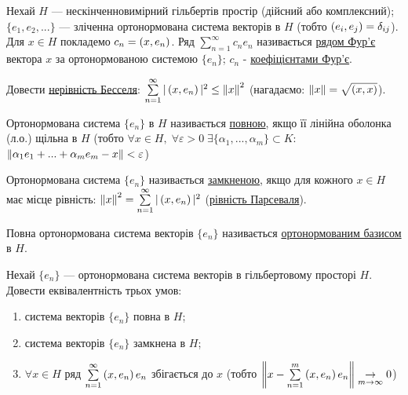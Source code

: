 
\begin{theory}
    Нехай $H$ --- нескінченновимірний гільбертів простір (дійсний або комплексний); 
    $\{e_1, e_2, ...\}$ --- зліченна ортонормована система векторів в $H$ (тобто $\left(e_i, e_j\right) 
    = \delta_{ij}$). Для $x \in H$ покладемо $c_n = \left(x, e_n\right)$. Ряд $\sum\limits_{n=1}^\infty 
    c_n e_n$ називається \underline{рядом Фур'є} вектора $x$ за ортонормованою системою 
    $\{e_n\}$; $c_n$ - \underline{коефіцієнтами Фур'є}.
\end{theory}

\begin{exercise}
    Довести \underline{нерівність Бесселя}: $\sum\limits_{n=1}^\infty |\left(x, e_n\right)|^2 \leq 
    \left\lVert x\right\rVert^2$ (нагадаємо: $\left\lVert x\right\rVert = \sqrt{\left(x, x\right)}$).
\end{exercise}

\begin{theory}
    Ортонормована система $\{e_n\}$ в $H$ називається \underline{повною}, якщо її лінійна 
    оболонка (л.о.) щільна в $H$ 
    (тобто $\forall x \in H, \;\forall \varepsilon > 0 \; \exists \{\alpha_1, ..., 
    \alpha_m\} \subset K$: $\left\lVert\alpha_1 e_1 + ... + \alpha_m e_m - x\right\rVert < \varepsilon$)

    Ортонормована система $\{e_n\}$ називається \underline{замкненою}, якщо для кожного 
    $x \in H$ має місце рівність: $\left\lVert x\right\rVert^2 = \sum\limits_{n=1}^\infty |\left(x, e_n\right)|^2$ 
    (\underline{рівність Парсеваля}).

    Повна ортонормована система векторів $\{e_n\}$ називається \underline{ортонормованим 
    базисом} в $H$.
\end{theory}

\begin{exercise}
    Нехай $\{e_n\}$ --- ортонормована система векторів в гільбертовому просторі $H$. 
    Довести еквівалентність трьох умов:
    \begin{enumerate}[label=\ukr*)]
        \item система векторів $\{e_n\}$ повна в $H$;
        \item система векторів $\{e_n\}$ замкнена в $H$;
        \item $\forall x \in H$ ряд $\sum\limits_{n=1}^\infty \left(x, e_n\right)e_n$ збігається до $x$
        (тобто $\left\lVert x - \sum\limits_{n=1}^m \left(x, e_n\right)e_n\right\rVert
        \underset{m\rightarrow\infty}{\rightarrow}0$)
    \end{enumerate}
\end{exercise}

